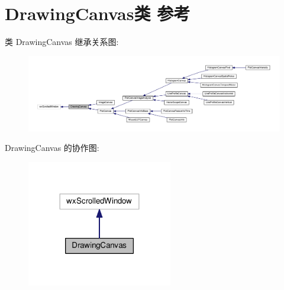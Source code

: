\hypertarget{class_drawing_canvas}{\section{Drawing\+Canvas类 参考}
\label{class_drawing_canvas}
}


类 Drawing\+Canvas 继承关系图\+:
\nopagebreak
\begin{figure}[H]
\begin{center}
\leavevmode
\includegraphics[width=350pt]{class_drawing_canvas__inherit__graph}
\end{center}
\end{figure}


Drawing\+Canvas 的协作图\+:
\nopagebreak
\begin{figure}[H]
\begin{center}
\leavevmode
\includegraphics[width=180pt]{class_drawing_canvas__coll__graph}
\end{center}
\end{figure}
